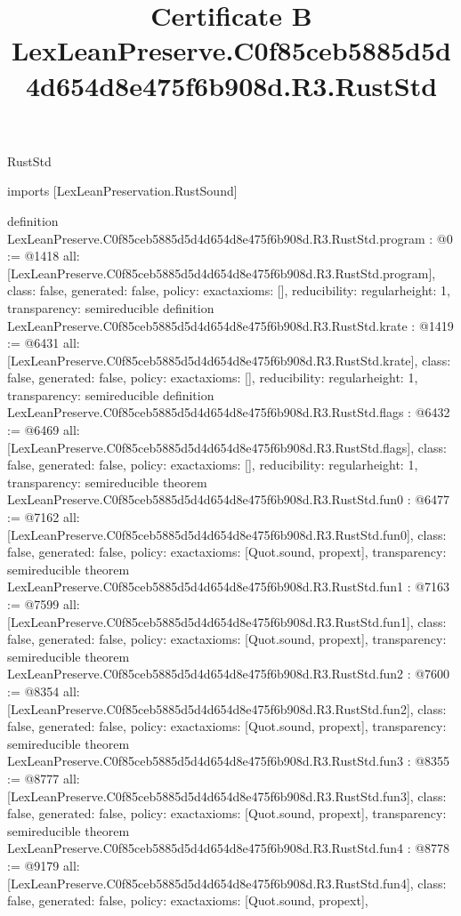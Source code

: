 \begin{lexlean}{RustStd}
\title{Certificate B LexLeanPreserve.C0f85ceb5885d5d4d654d8e475f6b908d.R3.RustStd}
\begin{coremodule}
imports [LexLeanPreservation.RustSound]

definition LexLeanPreserve.C0f85ceb5885d5d4d654d8e475f6b908d.R3.RustStd.program : @0 := @1418 {
  all: [LexLeanPreserve.C0f85ceb5885d5d4d654d8e475f6b908d.R3.RustStd.program],
  class: false,
  generated: false,
  policy: exact{axioms: []},
  reducibility: regular{height: 1},
  transparency: semireducible
}
definition LexLeanPreserve.C0f85ceb5885d5d4d654d8e475f6b908d.R3.RustStd.krate : @1419 := @6431 {
  all: [LexLeanPreserve.C0f85ceb5885d5d4d654d8e475f6b908d.R3.RustStd.krate],
  class: false,
  generated: false,
  policy: exact{axioms: []},
  reducibility: regular{height: 1},
  transparency: semireducible
}
definition LexLeanPreserve.C0f85ceb5885d5d4d654d8e475f6b908d.R3.RustStd.flags : @6432 := @6469 {
  all: [LexLeanPreserve.C0f85ceb5885d5d4d654d8e475f6b908d.R3.RustStd.flags],
  class: false,
  generated: false,
  policy: exact{axioms: []},
  reducibility: regular{height: 1},
  transparency: semireducible
}
theorem LexLeanPreserve.C0f85ceb5885d5d4d654d8e475f6b908d.R3.RustStd.fun0 : @6477 := @7162 {
  all: [LexLeanPreserve.C0f85ceb5885d5d4d654d8e475f6b908d.R3.RustStd.fun0],
  class: false,
  generated: false,
  policy: exact{axioms: [Quot.sound, propext]},
  transparency: semireducible
}
theorem LexLeanPreserve.C0f85ceb5885d5d4d654d8e475f6b908d.R3.RustStd.fun1 : @7163 := @7599 {
  all: [LexLeanPreserve.C0f85ceb5885d5d4d654d8e475f6b908d.R3.RustStd.fun1],
  class: false,
  generated: false,
  policy: exact{axioms: [Quot.sound, propext]},
  transparency: semireducible
}
theorem LexLeanPreserve.C0f85ceb5885d5d4d654d8e475f6b908d.R3.RustStd.fun2 : @7600 := @8354 {
  all: [LexLeanPreserve.C0f85ceb5885d5d4d654d8e475f6b908d.R3.RustStd.fun2],
  class: false,
  generated: false,
  policy: exact{axioms: [Quot.sound, propext]},
  transparency: semireducible
}
theorem LexLeanPreserve.C0f85ceb5885d5d4d654d8e475f6b908d.R3.RustStd.fun3 : @8355 := @8777 {
  all: [LexLeanPreserve.C0f85ceb5885d5d4d654d8e475f6b908d.R3.RustStd.fun3],
  class: false,
  generated: false,
  policy: exact{axioms: [Quot.sound, propext]},
  transparency: semireducible
}
theorem LexLeanPreserve.C0f85ceb5885d5d4d654d8e475f6b908d.R3.RustStd.fun4 : @8778 := @9179 {
  all: [LexLeanPreserve.C0f85ceb5885d5d4d654d8e475f6b908d.R3.RustStd.fun4],
  class: false,
  generated: false,
  policy: exact{axioms: [Quot.sound, propext]},
}
\end{coremodule}
\end{lexlean}
